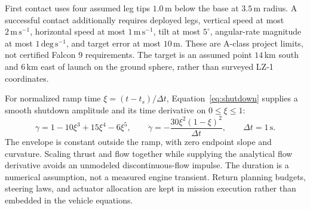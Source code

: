 First contact uses four assumed leg tips $1.0\,\mathrm{m}$ below the base at $3.5\,\mathrm{m}$ radius. A successful contact additionally requires deployed legs, vertical speed at most $2\,\mathrm{m\,s^{-1}}$, horizontal speed at most $1\,\mathrm{m\,s^{-1}}$, tilt at most $5^\circ$, angular-rate magnitude at most $1\,\mathrm{deg\,s^{-1}}$, and target error at most $10\,\mathrm{m}$. These are A-class project limits, not certified Falcon 9 requirements. The target is an assumed point $14\,\mathrm{km}$ south and $6\,\mathrm{km}$ east of launch on the ground sphere, rather than surveyed LZ-1 coordinates.

For normalized ramp time $\xi=(t-t_s)/\Delta t$, Equation~\eqref{eq:shutdown} supplies a smooth shutdown amplitude and its time derivative on $0\leq\xi\leq1$:
\begin{equation}
 \gamma=1-10\xi^3+15\xi^4-6\xi^5,\qquad
 \dot\gamma=-\frac{30\xi^2(1-\xi)^2}{\Delta t},\qquad \Delta t=1\,\mathrm{s}.
\label{eq:shutdown}
\end{equation}
The envelope is constant outside the ramp, with zero endpoint slope and curvature. Scaling thrust and flow together while supplying the analytical flow derivative avoids an unmodeled discontinuous-flow impulse. The duration is a numerical assumption, not a measured engine transient. Return planning budgets, steering laws, and actuator allocation are kept in mission execution rather than embedded in the vehicle equations.

